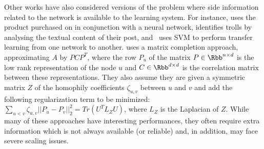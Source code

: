 \begin{newcontent}
\bigskip

Other works have also
considered versions of the problem where side information related to the network is available to
the learning system. For instance, \autocite{EdgeSignsRating15} uses the product purchased on
\epi{} in conjunction with a neural network, \autocite{TrollDetection15} identifies trolls by
analysing the textual content of their post, and~\autocite{SNTransfer13} uses SVM to perform
transfer learning from one network to another.
\autocite{Tang2013} uses a matrix completion approach, approximating $A$ by $PCP^T$, where the
row $P_u$ of the matrix $P\in\Rbb^{n\times d}$ is the low rank representation of the node $u$ and
$C\in\Rbb^{d\times d}$ is the correlation matrix between these representations. They also assume
they are given a symmetric matrix $Z$ of the homophily coefficients $\zeta_{u,v}$ between $u$ and
$v$ and add the following regularization term to be minimized: $\sum_{u<v} \zeta_{u,v}||P_u -
P_v||_2^2 = Tr(U^T L_Z U)$, where $L_Z$ is the Laplacian of $Z$.
While many of these approaches have interesting
performances, they often require extra information which is not always available (or reliable) and,
in addition, may face severe scaling issues.

\medskip


\end{newcontent}
